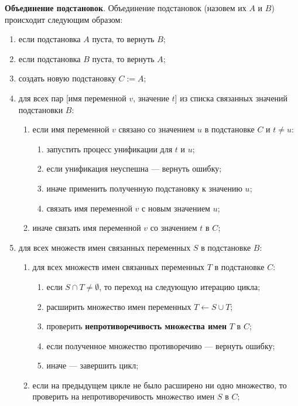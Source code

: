 \textbf{Объединение подстановок}. Объединение подстановок (назовем их $A$ и $B$) происходит следующим образом:

\begin{enumerate}
    \item если подстановка $A$ пуста, то вернуть $B$;
    \item если подстановка $B$ пуста, то вернуть $A$;
    \item создать новую подстановку $C := A$;
    \item для всех пар [имя переменной $v$, значение $t$] из списка связанных значений подстановки $B$:
    \begin{enumerate}
        \item если имя переменной $v$ связано со значением $u$ в подстановке $C$ и $t \ne u$:
        \begin{enumerate}
            \item запустить процесс унификации для $t$ и $u$;
            \item если унификация неуспешна --- вернуть ошибку;
            \item иначе применить полученную подстановку к значению $u$;
            \item связать имя переменной $v$ с новым значением $u$;
        \end{enumerate}
        \item иначе связать имя переменной $v$ со значением $t$ в $C$;
    \end{enumerate}
    \item для всех множеств имен связанных переменных $S$ в подстановке $B$:
    \begin{enumerate}
        \item для всех множеств имен связанных переменных $T$ в подстановке $C$:
        \begin{enumerate}
            \item если $S \cap T \ne \emptyset$, то переход на следующую итерацию цикла;
            \item расширить множество имен переменных $T \leftarrow S \cup T$;
            \item проверить \textbf{непротиворечивость множества имен} $T$ в $C$;
            \item если полученное множество противоречиво --- вернуть ошибку;
            \item иначе --- завершить цикл;
        \end{enumerate}
        \item если на предыдущем цикле не было расширено ни одно множество, то проверить на непротиворечивость множество имен $S$ в $C$;

\end{enumerate}
\end{enumerate}
